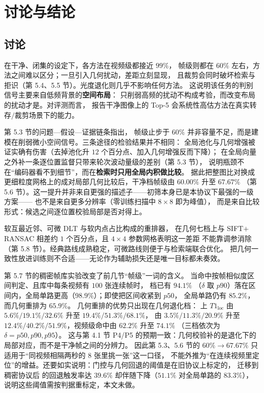 \section{讨论与结论}
\label{sec:conclusion}

\subsection{讨论}

在干净、闭集的设定下，各方法在视频级都接近 $99\%$，
帧级则都在 $60\%$ 左右，方法之间难以区分；一旦引入几何扰动，差距立刻显现，
且裁剪会同时破坏检索与拒识（第 5.4、5.5 节）。光度退化则几乎不影响任何方法。
这说明该任务的判别信号主要来自低频背景的\textbf{空间布局}：
只削弱高频的扰动不构成考验，而改变布局的扰动才是。对评测而言，
报告干净图像上的 Top-5 会系统性高估方法在真实转存$/$裁剪场景下的能力。

第 5.3 节的问题—假设—证据链条指出，
帧级止步于 $60\%$ 并非容量不足，而是建模在削弱微小空间信号。三条途径的检验结果并不相同：
全局池化与几何增强被证实确有伤害（去掉池化升 $12$ 个百分点、加入几何增强反而下降）；
在全局向量之外补一条逐位置监督只带来轮次波动量级的差别（第 5.3 节），
说明瓶颈不在“编码器看不到细节”，而在\textbf{检索时只用全局内积做比较}。
据此把整图比对换成更细粒度网格上的成对局部几何比较后，干净档帧级由 $60.00\%$ 升至 $67.67\%$
（第 5.6 节）。这一提升并非来自更强的描述子——初筛本身已是本协议下最强的一级方案——
也不是来自更多分辨率（零训练扫描中 $8\times8$ 即为峰值），
而是来自比较形式：候选之间逐位置校验局部是否对得上。

软互最近邻、可微 DLT 与软内点占比构成的重排器，
在几何七档上与 SIFT$+$RANSAC 相差约 $1$ 个百分点，且 $4\times4$ 参数网格表明这一差距
不能靠调参消除（第 5.8 节）。经典路线成熟稳定，可微路线则便于与检索端联合优化。
把几何一致性放进训练则不合适——无论作为辅助损失还是唯一目标都未奏效。

第 5.7 节的稠密帧库实验改变了前几节“帧级”一词的含义。
当命中按帧相似度区间判定、且库中每条视频有 $100$ 张连续帧时， 档已有 $94.1\%$
（$\delta$ 取 $p90$）落在区间内，全局单路更高（$98.9\%$）；即使把区间收紧到 $p50$，
全局单路仍有 $85.2\%$，而几何重排为 $65.9\%$。
几何重排的优势只出现在几何退化档： 上 $T1_{\text{loc}}$ 由
$5.6\%/19.1\%/32.6\%$ 升至 $19.4\%/51.3\%/68.1\%$， 由
$3.5\%/11.3\%/20.9\%$ 升至 $12.4\%/40.2\%/51.9\%$，视频级命中由 $62.2\%$ 升至 $74.1\%$
（三档依次为 $\delta=p50,p90,p95$）。
这与第 4.1 节 P4/P5 的预期一致：几何校验补的是退化下的局部对应，而不是干净帧之间的分辨力。
因此第 5.3、5.6 节的 $60\%\rightarrow67.67\%$ 只适用于“同视频相隔两秒的 $8$ 张里挑一张”这一口径，
不能外推为“在连续视频里定位”的增益。还要如实说明：门控与几何回退的阈值是在旧协议上标定的，
迁移到稠密协议后  的回退触发率达 $39.6\%$ 却伴随下降（$51.1\%$ 对全局单路的 $83.3\%$），
说明这些阈值需按判据重标定，本文未做。

